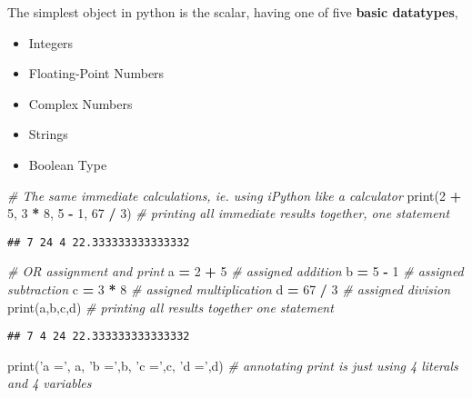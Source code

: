 \documentclass[]{book}
\newenvironment{Shaded}{\begin{snugshade}}{\end{snugshade}}
\newcommand{\DecValTok}[1]{\textcolor[rgb]{0.00,0.00,0.81}{#1}}
\newcommand{\StringTok}[1]{\textcolor[rgb]{0.31,0.60,0.02}{#1}}
\newcommand{\CommentTok}[1]{\textcolor[rgb]{0.56,0.35,0.01}{\textit{#1}}}
\newcommand{\OperatorTok}[1]{\textcolor[rgb]{0.81,0.36,0.00}{\textbf{#1}}}
\newcommand{\BuiltInTok}[1]{#1}
\newcommand{\NormalTok}[1]{#1}
\providecommand{\tightlist}{%
  \setlength{\itemsep}{0pt}\setlength{\parskip}{0pt}}
\theoremstyle{definition}
\theoremstyle{definition}
\theoremstyle{definition}
\theoremstyle{remark}
\begin{document}
The simplest object in python is the scalar, having one of five
\textbf{basic datatypes},

\begin{itemize}
\tightlist
\item
  Integers
\item
  Floating-Point Numbers
\item
  Complex Numbers
\item
  Strings
\item
  Boolean Type
\end{itemize}

\begin{Shaded}
\begin{Highlighting}[]
\CommentTok{# The same immediate calculations, ie. using iPython like a calculator}
\BuiltInTok{print}\NormalTok{(}\DecValTok{2} \OperatorTok{+} \DecValTok{5}\NormalTok{, }\DecValTok{3} \OperatorTok{*} \DecValTok{8}\NormalTok{, }\DecValTok{5} \OperatorTok{-} \DecValTok{1}\NormalTok{, }\DecValTok{67} \OperatorTok{/} \DecValTok{3}\NormalTok{) }\CommentTok{# printing all immediate results together, one statement}
\end{Highlighting}
\end{Shaded}

\begin{verbatim}
## 7 24 4 22.333333333333332
\end{verbatim}

\begin{Shaded}
\begin{Highlighting}[]
\CommentTok{# OR assignment and print}
\NormalTok{a }\OperatorTok{=} \DecValTok{2} \OperatorTok{+} \DecValTok{5}           \CommentTok{# assigned addition}
\NormalTok{b }\OperatorTok{=} \DecValTok{5} \OperatorTok{-} \DecValTok{1}           \CommentTok{# assigned subtraction}
\NormalTok{c }\OperatorTok{=} \DecValTok{3} \OperatorTok{*} \DecValTok{8}           \CommentTok{# assigned multiplication}
\NormalTok{d }\OperatorTok{=} \DecValTok{67} \OperatorTok{/} \DecValTok{3}          \CommentTok{# assigned division}
\BuiltInTok{print}\NormalTok{(a,b,c,d)      }\CommentTok{# printing all results together one statement}
\end{Highlighting}
\end{Shaded}

\begin{verbatim}
## 7 4 24 22.333333333333332
\end{verbatim}

\begin{Shaded}
\begin{Highlighting}[]
\BuiltInTok{print}\NormalTok{(}\StringTok{'a ='}\NormalTok{, a, }\StringTok{'b ='}\NormalTok{,b, }\StringTok{'c ='}\NormalTok{,c, }\StringTok{'d ='}\NormalTok{,d) }\CommentTok{# annotating print is just using 4 literals and 4 variables}
\end{Highlighting}
\end{Shaded}
\end{document}
